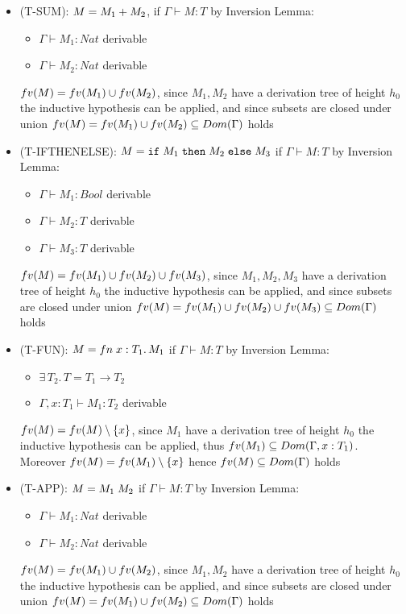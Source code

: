 \begin{itemize}
	\item (T-SUM): $M = M_1+M_2$,
	      if $\Gamma \vdash M: T$
	      by Inversion Lemma:
	      \begin{itemize}
		      \item $\Gamma \vdash M_1 : Nat$ derivable
		      \item $\Gamma \vdash M_2 : Nat$ derivable
	      \end{itemize}
	      $fv(M)=fv(M_1)\cup fv(M_2)$, since $M_1, M_2$ have a derivation tree of height $h_0$
	      the inductive hypothesis can be applied, and since subsets are closed under union
	      $fv(M)=fv(M_1)\cup fv(M_2) \subseteq Dom(\Gamma)$ holds
	\item (T-IFTHENELSE): $M = \texttt{if}\;M_1\;\texttt{then}\;M_2\;\texttt{else}\;M_3$
	      if $\Gamma \vdash M: T$
	      by Inversion Lemma:
	      \begin{itemize}
		      \item $\Gamma \vdash M_1 : Bool$ derivable
		      \item $\Gamma \vdash M_2 : T$ derivable
		      \item $\Gamma \vdash M_3 : T$ derivable
	      \end{itemize}
	      $fv(M)=fv(M_1)\cup fv(M_2)\cup fv(M_3)$, since $M_1, M_2, M_3$ have a derivation tree of height $h_0$
	      the inductive hypothesis can be applied, and since subsets are closed under union
	      $fv(M)=fv(M_1)\cup fv(M_2)\cup fv(M_3) \subseteq Dom(\Gamma)$ holds
	\item (T-FUN): $M = fn\;x: T_1.\,M_1$
	      if $\Gamma \vdash M: T$
	      by Inversion Lemma:
	      \begin{itemize}
		      \item $\exists\, T_2.\, T = T_1 \to T_2$
		      \item $\Gamma, x: T_1 \vdash M_1 : T_2$ derivable
	      \end{itemize}
	      $fv(M)=fv(M)\setminus \{x\}$, since $M_1$ have a derivation tree of height $h_0$
	      the inductive hypothesis can be applied, thus $fv(M_1)\subseteq Dom(\Gamma,x:T_1)$.
	      Moreover $fv(M)=fv(M_1)\setminus\{x\}$ hence $fv(M)\subseteq Dom(\Gamma)$ holds
	\item (T-APP): $M = M_1\;M_2$
	      if $\Gamma \vdash M: T$
	      by Inversion Lemma:
	      \begin{itemize}
		      \item $\Gamma \vdash M_1 : Nat$ derivable
		      \item $\Gamma \vdash M_2 : Nat$ derivable
	      \end{itemize}
	      $fv(M)=fv(M_1)\cup fv(M_2)$, since $M_1, M_2$ have a derivation tree of height $h_0$
	      the inductive hypothesis can be applied, and since subsets are closed under union
	      $fv(M)=fv(M_1)\cup fv(M_2) \subseteq Dom(\Gamma)$ holds
\end{itemize}

